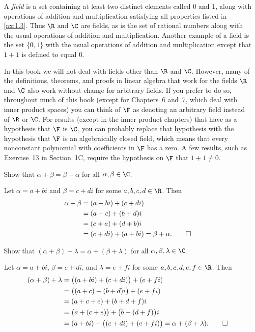 A \emph{field} is a set containing at least two distinct elements called $0$
and $1$, along with operations of addition and multiplication satisfying all
properties listed in \ref{ax:1.3}. Thus $\R$ and $\C$ are fields, as is the set
of rational numbers along with the usual operations of addition and
multiplication. Another example of a field is the set $\{0,1\}$ with the usual
operations of addition and multiplication except that $1+1$ is defined to
equal $0$.

In this book we will not deal with fields other than $\R$ and $\C$. However,
many of the definitions, theorems, and proofs in linear algebra that work for
the fields $\R$ and $\C$ also work without change for arbitrary fields. If you
prefer to do so, throughout much of this book (except for Chapters~6 and~7,
which deal with inner product spaces) you can think of $\F$ as denoting an
arbitrary field instead of $\R$ or $\C$. For results (except in the inner
product chapters) that have as a hypothesis that $\F$ is $\C$, you can probably
replace that hypothesis with the hypothesis that $\F$ is an algebraically
closed field, which means that every nonconstant polynomial with coefficients
in $\F$ has a zero. A few results, such as Exercise~13 in Section~1C, require
the hypothesis on $\F$ that $1+1\ne0$.


\begin{exercise}
Show that $\alpha+\beta=\beta+\alpha$ for all $\alpha,\beta\in\C$.
\end{exercise}
\begin{solution}
Let $\alpha=a+bi$ and $\beta=c+di$ for some $a,b,c,d\in\R$. Then
\begin{align*}
\alpha+\beta &= (a+bi)+(c+di)\\
             &= (a+c)+(b+d)i\\
             &= (c+a)+(d+b)i\\
             &= (c+di)+(a+bi) = \beta+\alpha. \qedhere
\end{align*}
\end{solution}

\begin{exercise}
Show that $(\alpha+\beta)+\lambda=\alpha+(\beta+\lambda)$ for all
$\alpha,\beta,\lambda\in\C$.
\end{exercise}
\begin{solution}
Let $\alpha=a+bi$, $\beta=c+di$, and $\lambda=e+fi$ for some
$a,b,c,d,e,f\in\R$. Then
\begin{align*}
(\alpha+\beta)+\lambda &= \bigl((a+bi)+(c+di)\bigr)+(e+fi)\\
  &= \bigl((a+c)+(b+d)i\bigr)+(e+fi)\\
  &= (a+c+e)+(b+d+f)i\\
  &= \bigl(a+(c+e)\bigr)+\bigl(b+(d+f)\bigr)i\\
  &= (a+bi)+\bigl((c+di)+(e+fi)\bigr) = \alpha+(\beta+\lambda). \qedhere
\end{align*}
\end{solution}


